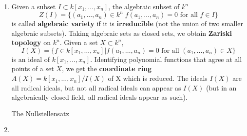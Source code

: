 \begin{enumerate}
      \item
            Given a subset $I\subset k[x_1,\ldots,x_n]$, the algebraic subset of $k^n$
            $$Z(I)=\{(a_1,\ldots,a_n)\in k^n | f(a_1,\ldots,a_n)=0\text{ for all }f\in I\}$$
            is called \textbf{algebraic variety} if it is \textbf{irreducible} (not the union of two smaller
            algebraic subsets). Taking algebraic sets as closed sets, we obtain \textbf{Zariski topology} on $k^n$.
            Given a set $X\subset k^n$, $$I(X) =\{f\in k[x_1,\ldots,x_n]|f(a_1,\ldots,a_n)=0\text{ for all }
                  (a_1,\ldots,a_n)\in X\}$$ is an ideal of $k[x_1,\ldots,x_n]$. Identifying polynomial functions that
            agree at all points of a set $X$, we get the \textbf{coordinate ring} $A(X)=k[x_1,\ldots,x_n]/I(X)$ of X
            which is reduced. The ideals $I(X)$ are all radical ideals, but not all radical ideals can appear as $I(X)$
            (but in an algebraically closed field, all radical ideals appear as such).

            \begin{mybox}{The Nullstellensatz}
                  
            \end{mybox}

      \item
\end{enumerate}